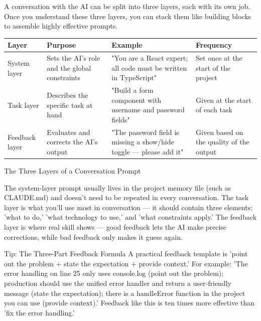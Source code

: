 


A conversation with the AI can be split into three layers, each with its own job. Once you understand these three layers, you can stack them like building blocks to assemble highly effective prompts.

\begin{center}
\begin{tabularx}{\linewidth}{|X|X|X|X|}
\hline
\textbf{Layer} & \textbf{Purpose} & \textbf{Example} & \textbf{Frequency} \tabularnewline
\hline
System layer & Sets the AI's role and the global constraints & "You are a React expert; all code must be written in TypeScript" & Set once at the start of the project \tabularnewline
Task layer & Describes the specific task at hand & "Build a form component with username and password fields" & Given at the start of each task \tabularnewline
Feedback layer & Evaluates and corrects the AI's output & "The password field is missing a show/hide toggle — please add it" & Given based on the quality of the output \tabularnewline
\hline
\end{tabularx}
\end{center}

\begin{center}\small\color{gray}The Three Layers of a Conversation Prompt\end{center}

The system-layer prompt usually lives in the project memory file (such as CLAUDE.md) and doesn't need to be repeated in every conversation. The task layer is what you'll use most in conversation — it should contain three elements: 'what to do,' 'what technology to use,' and 'what constraints apply.' The feedback layer is where real skill shows — good feedback lets the AI make precise corrections, while bad feedback only makes it guess again.

\begin{tcbinfo}{Tip: The Three-Part Feedback Formula}
A practical feedback template is 'point out the problem + state the expectation + provide context.' For example: 'The error handling on line 25 only uses console.log (point out the problem); production should use the unified error handler and return a user-friendly message (state the expectation); there is a handleError function in the project you can use (provide context).' Feedback like this is ten times more effective than 'fix the error handling.'

\end{tcbinfo}

